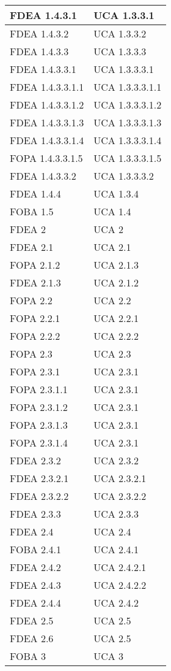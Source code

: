 \begin{longtable}{XX}
\midrule
FDEA 1.4.3.1&UCA 1.3.3.1\\
\midrule
FDEA 1.4.3.2&UCA 1.3.3.2\\
\midrule
FDEA 1.4.3.3&UCA 1.3.3.3\\
\midrule
FDEA 1.4.3.3.1&UCA 1.3.3.3.1\\
\midrule
FDEA 1.4.3.3.1.1&UCA 1.3.3.3.1.1\\
\midrule
FDEA 1.4.3.3.1.2&UCA 1.3.3.3.1.2\\
\midrule
FDEA 1.4.3.3.1.3&UCA 1.3.3.3.1.3\\
\midrule
FDEA 1.4.3.3.1.4&UCA 1.3.3.3.1.4\\
\midrule
FOPA 1.4.3.3.1.5&UCA 1.3.3.3.1.5\\
\midrule
FDEA 1.4.3.3.2&UCA 1.3.3.3.2\\
\midrule
FDEA 1.4.4&UCA 1.3.4\\
\midrule
FOBA 1.5&UCA 1.4\\
\midrule
FDEA 2&UCA 2\\
\midrule
FDEA 2.1&UCA 2.1\\
\midrule
FOPA 2.1.2&UCA 2.1.3\\
\midrule
FDEA 2.1.3&UCA 2.1.2\\
\midrule
FOPA 2.2&UCA 2.2\\
\midrule
FOPA 2.2.1&UCA 2.2.1\\
\midrule
FOPA 2.2.2&UCA 2.2.2\\
\midrule
FOPA 2.3&UCA 2.3\\
\midrule
FOPA 2.3.1&UCA 2.3.1\\
\midrule
FOPA 2.3.1.1&UCA 2.3.1\\
\midrule
FOPA 2.3.1.2&UCA 2.3.1\\
\midrule
FOPA 2.3.1.3&UCA 2.3.1\\
\midrule
FOPA 2.3.1.4&UCA 2.3.1\\
\midrule
FDEA 2.3.2&UCA 2.3.2\\
\midrule
FDEA 2.3.2.1&UCA 2.3.2.1\\
\midrule
FDEA 2.3.2.2&UCA 2.3.2.2\\
\midrule
FDEA 2.3.3&UCA 2.3.3\\
\midrule
FDEA 2.4&UCA 2.4\\
\midrule
FOBA 2.4.1&UCA 2.4.1\\
\midrule
FDEA 2.4.2&UCA 2.4.2.1\\
\midrule
FDEA 2.4.3&UCA 2.4.2.2\\
\midrule
FDEA 2.4.4&UCA 2.4.2\\
\midrule
FDEA 2.5&UCA 2.5\\
\midrule
FDEA 2.6&UCA 2.5\\
\midrule
FOBA 3&UCA 3\\
\midrule


\end{longtable}
